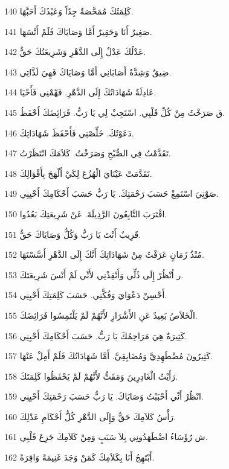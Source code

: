 \par 140 كَلِمَتُكَ مُمَحَّصَةٌ جِدّاً وَعَبْدُكَ أَحَبَّهَا.
\par 141 صَغِيرٌ أَنَا وَحَقِيرٌ أَمَّا وَصَايَاكَ فَلَمْ أَنْسَهَا.
\par 142 عَدْلُكَ عَدْلٌ إِلَى الدَّهْرِ وَشَرِيعَتُكَ حَقٌّ.
\par 143 ضِيقٌ وَشِدَّةٌ أَصَابَانِي أَمَّا وَصَايَاكَ فَهِيَ لَذَّاتِي.
\par 144 عَادِلَةٌ شَهَادَاتُكَ إِلَى الدَّهْرِ. فَهِّمْنِي فَأَحْيَا.
\par 145 ق صَرَخْتُ مِنْ كُلِّ قَلْبِي. اسْتَجِبْ لِي يَا رَبُّ. فَرَائِضَكَ أَحْفَظُ.
\par 146 دَعَوْتُكَ. خَلِّصْنِي فَأَحْفَظَ شَهَادَاتِكَ.
\par 147 تَقَدَّمْتُ فِي الصُّبْحِ وَصَرَخْتُ. كَلاَمَكَ انْتَظَرْتُ.
\par 148 تَقَدَّمَتْ عَيْنَايَ الْهُزُعَ لِكَيْ أَلْهَجَ بِأَقْوَالِكَ.
\par 149 صَوْتِيَ اسْتَمِعْ حَسَبَ رَحْمَتِكَ. يَا رَبُّ حَسَبَ أَحْكَامِكَ أَحْيِنِي.
\par 150 اقْتَرَبَ التَّابِعُونَ الرَّذِيلَةَ. عَنْ شَرِيعَتِكَ بَعُدُوا.
\par 151 قَرِيبٌ أَنْتَ يَا رَبُّ وَكُلُّ وَصَايَاكَ حَقٌّ.
\par 152 مُنْذُ زَمَانٍ عَرَفْتُ مِنْ شَهَادَاتِكَ أَنَّكَ إِلَى الدَّهْرِ أَسَّسْتَهَا.
\par 153 ر اُنْظُرْ إِلَى ذُلِّي وَأَنْقِذْنِي لأَنِّي لَمْ أَنْسَ شَرِيعَتَكَ.
\par 154 أَحْسِنْ دَعْوَايَ وَفُكَّنِي. حَسَبَ كَلِمَتِكَ أَحْيِنِي.
\par 155 الْخَلاَصُ بَعِيدٌ عَنِ الأَشْرَارِ لأَنَّهُمْ لَمْ يَلْتَمِسُوا فَرَائِضَكَ.
\par 156 كَثِيرَةٌ هِيَ مَرَاحِمُكَ يَا رَبُّ. حَسَبَ أَحْكَامِكَ أَحْيِنِي.
\par 157 كَثِيرُونَ مُضْطَهِدِيَّ وَمُضَايِقِيَّ. أَمَّا شَهَادَاتُكَ فَلَمْ أَمِلْ عَنْهَا.
\par 158 رَأَيْتُ الْغَادِرِينَ وَمَقَتُّ لأَنَّهُمْ لَمْ يَحْفَظُوا كَلِمَتَكَ.
\par 159 انْظُرْ أَنِّي أَحْبَبْتُ وَصَايَاكَ. يَا رَبُّ حَسَبَ رَحْمَتِكَ أَحْيِنِي.
\par 160 رَأْسُ كَلاَمِكَ حَقٌّ وَإِلَى الدَّهْرِ كُلُّ أَحْكَامِ عَدْلِكَ.
\par 161 ش رُؤَسَاءُ اضْطَهَدُونِي بِلاَ سَبَبٍ وَمِنْ كَلاَمِكَ جَزِعَ قَلْبِي.
\par 162 أَبْتَهِجُ أَنَا بِكَلاَمِكَ كَمَنْ وَجَدَ غَنِيمَةً وَافِرَةً.
